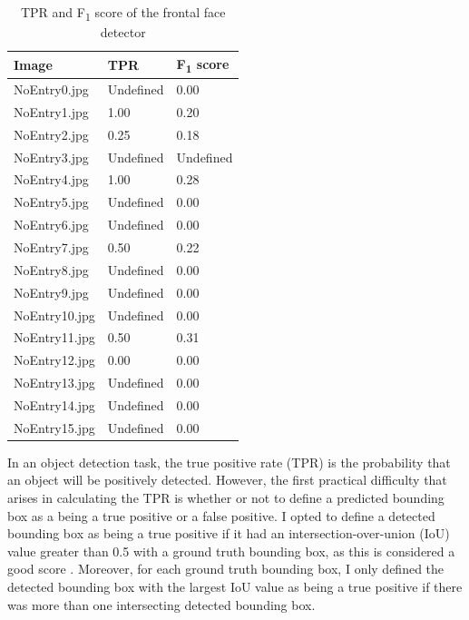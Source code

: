 \documentclass[onecolumn, 11pt, a4paper]{article}
\begin{document}
\begin{table}
  \vspace{-2.5em}
  \begin{center}
  \caption{TPR and F\textsubscript{1} score of the frontal face detector}\label{tab:face}
  \begin{tabular}{l | l l} 
    \hline\hline
    Image&TPR&F\textsubscript{1} score\\
    \hline
    NoEntry0.jpg&Undefined&0.00\\ 
    NoEntry1.jpg&1.00&0.20\\ 
    NoEntry2.jpg&0.25&0.18\\ 
    NoEntry3.jpg&Undefined&Undefined\\ 
    NoEntry4.jpg&1.00&0.28\\ 
    NoEntry5.jpg&Undefined&0.00\\ 
    NoEntry6.jpg&Undefined&0.00\\ 
    NoEntry7.jpg&0.50&0.22\\ 
    NoEntry8.jpg&Undefined&0.00\\ 
    NoEntry9.jpg&Undefined&0.00\\ 
    NoEntry10.jpg&Undefined&0.00\\ 
    NoEntry11.jpg&0.50&0.31\\ 
    NoEntry12.jpg&0.00&0.00\\ 
    NoEntry13.jpg&Undefined&0.00\\ 
    NoEntry14.jpg&Undefined&0.00\\ 
    NoEntry15.jpg&Undefined&0.00\\ 
    \hline
  \end{tabular}
  \end{center}
\end{table} 

In an object detection task, the true positive rate (TPR) is the probability that an object will be positively detected.
However, the first practical difficulty that arises in calculating the TPR is whether or not to define a predicted bounding box as a being a true positive or a false positive.
I opted to define a detected bounding box as being a true positive if it had an intersection-over-union (IoU) value greater than 0.5 with a ground truth bounding box, as this is considered a good score \cite{iou}.
Moreover, for each ground truth bounding box, I only defined the detected bounding box with the largest IoU value as being a true positive if there was more than one intersecting detected bounding box.
\end{document}
